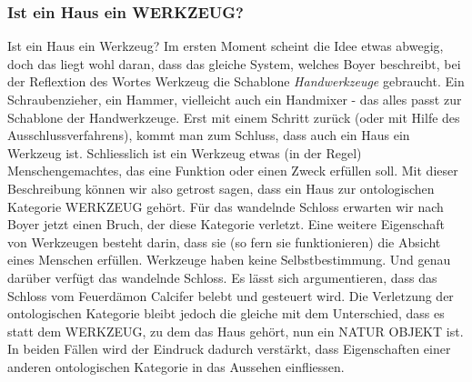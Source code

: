 \subsubsection{Ist ein Haus ein WERKZEUG?} 
Ist ein Haus ein Werkzeug? Im ersten Moment scheint die Idee etwas abwegig, doch das liegt wohl daran, dass das gleiche System, welches Boyer beschreibt, bei der Reflextion des Wortes Werkzeug die Schablone \emph{Handwerkzeuge} gebraucht. Ein Schraubenzieher, ein Hammer, vielleicht auch ein Handmixer - das alles passt zur Schablone der Handwerkzeuge. Erst mit einem Schritt zurück (oder mit Hilfe des Ausschlussverfahrens), kommt man zum Schluss, dass auch ein Haus ein Werkzeug ist. Schliesslich ist ein Werkzeug etwas (in der Regel) Menschengemachtes, das eine Funktion oder einen Zweck erfüllen soll. Mit dieser Beschreibung können wir also getrost sagen, dass ein Haus zur ontologischen Kategorie WERKZEUG gehört. Für das wandelnde Schloss erwarten wir nach Boyer jetzt einen Bruch, der diese Kategorie verletzt. Eine weitere Eigenschaft von Werkzeugen besteht darin, dass sie (so fern sie funktionieren) die Absicht eines Menschen erfüllen. Werkzeuge haben keine Selbstbestimmung. Und genau darüber verfügt das wandelnde Schloss. Es lässt sich argumentieren, dass das Schloss vom Feuerdämon Calcifer belebt und gesteuert wird. Die Verletzung der ontologischen Kategorie bleibt jedoch die gleiche mit dem Unterschied, dass es statt dem WERKZEUG, zu dem das Haus gehört, nun ein NATUR OBJEKT ist. In beiden Fällen wird der Eindruck dadurch verstärkt, dass Eigenschaften einer anderen ontologischen Kategorie in das Aussehen einfliessen. 